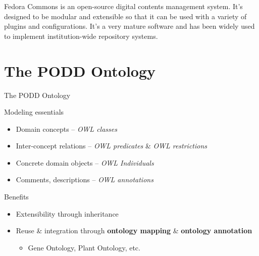 \documentclass[ignorenonframetext,compress]{beamer}
\begin{document}
Fedora Commons is an open-source digital contents management system. It's designed
to be modular and extensible so that it can be used with a variety of plugins
and configurations. It's a very mature software and has been widely used 
to implement institution-wide repository systems.

\section{The PODD Ontology}
\begin{frame}{The PODD Ontology}
\begin{block}{Modeling essentials}
    \begin{itemize}
    \item Domain concepts -- \emph{OWL classes}
    \item Inter-concept relations -- \emph{OWL predicates} \& \emph{OWL restrictions}
    \item Concrete domain objects -- \emph{OWL Individuals}
    \item Comments, descriptions -- \emph{OWL annotations}
    \end{itemize}
\end{block}
\pause
\begin{block}{Benefits}
	\begin{itemize}
	\item Extensibility through inheritance
	\item Reuse \& integration through \textbf{ontology mapping} \& \textbf{ontology annotation}
		\begin{itemize}
		\item Gene Ontology, Plant Ontology, etc.
		\end{itemize}
	\end{itemize}
\end{block}
\end{frame}
\end{document}

